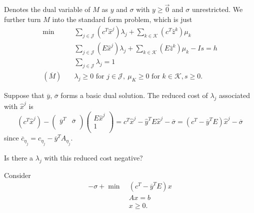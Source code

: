 \hr

Denotes the dual variable of \(M\) as \(y\) and \(\sigma\) with \(y\geq \vec{0}\) and \(\sigma\) unrestricted. We further turn \(M\) into
the standard form problem, which is just
\begin{align*}
	\min~               & \sum\limits_{j\in\mathcal{J}}\left(c^T\hat{x}^j\right)\lambda_{j} + \sum\limits_{k\in\mathcal{K}}\left(c^{T} \hat{z}^k  \right)\mu_k   \\
	                    & \sum\limits_{j\in\mathcal{J}}\left(E\hat{x}^j\right)\lambda_{j} + \sum\limits_{k\in\mathcal{K}}\left(E \hat{z}^k \right)\mu_k - Is = h \\
	                    & \sum\limits_{j\in\mathcal{J}}\lambda_{j} = 1                                                                                           \\
	(\overline{M})\quad & \lambda_{j}\geq 0 \text{ for }j\in\mathcal{J},\ \mu_K\geq 0 \text{ for }k\in\mathcal{K}, s\geq 0.
\end{align*}

Suppose that \(\overline{y}\), \(\overline{\sigma}\) forms a basic dual solution. The reduced cost of \(\lambda_{j}\) associated
with \(\hat{x}^j\) is
\[
	(c^{T}\hat{x}^j) - \begin{pmatrix}
		\overline{y}^{T} & \overline{\sigma} \\
	\end{pmatrix}\begin{pmatrix}
		E\hat{x}^j \\
		1          \\
	\end{pmatrix} = c^{T}\hat{x}^j - \hat{y}^{T}E\hat{x}^j - \overline{\sigma} = (c^{T} - \overline{y}^{T}E)\hat{x}^j - \overline{\sigma}
\]
since \(\overline{c}_{\eta_{j}} = c_{\eta_{j}} - \overline{y}^{T}A_{\eta_{j}}\).

\begin{problem}
Is there a \(\lambda_{j}\) with this reduced cost negative?
\end{problem}

\begin{answer}
	Consider
	\begin{align*}
		-\sigma + \min~ & (c^{T} - \overline{y}^{T}E)x \\
		                & Ax = b                       \\
		                & x\geq 0.
	\end{align*}
\end{answer}

